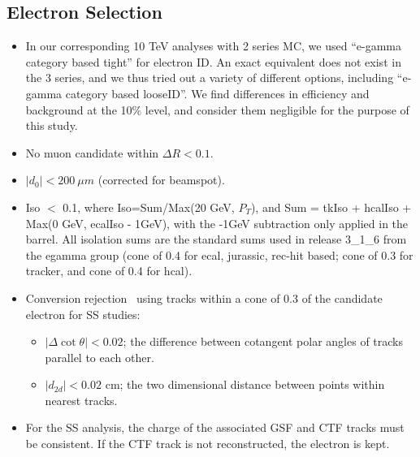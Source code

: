 \subsection{Electron Selection}
\label{sec:electron}

\begin{itemize}
\item In our corresponding 10 TeV analyses with 2 series MC, we used ``e-gamma category based tight'' for electron ID.
      An exact equivalent does not exist in the 3 series, and we thus tried out a variety of different options, including ``e-gamma category based looseID''.
      We find differences in efficiency and background at the 10\% level, and consider them negligible for the purpose of this study.
\item No muon candidate within $\Delta R < 0.1$.
\item $|d_0| < 200~\mu m$ (corrected for beamspot).
\item Iso $<$ 0.1, where Iso=Sum/Max(20 GeV, $P_T$), and Sum = tkIso + hcalIso +  Max(0 GeV, ecalIso - 1GeV), with the -1GeV subtraction
only applied in the barrel.
All isolation sums are the standard sums used in release 3\_1\_6 from the egamma group (cone of
0.4 for ecal, jurassic, rec-hit based; cone of 0.3 for tracker, and cone of 0.4 for hcal).
\item Conversion rejection~\cite{conversionnote} using tracks within a cone of 0.3 of the candidate electron for SS studies: 
\begin{itemize}
\item $|\Delta \cot\theta| < 0.02$; the difference between cotangent polar angles of tracks parallel to 
each other.
\item $|d_{2d}| < 0.02$ cm; the two dimensional distance between points within nearest tracks.
\end{itemize} 
\item For the SS analysis, the charge of the associated GSF and CTF tracks must be consistent.
If the CTF track is not reconstructed, the electron is kept.
\end{itemize}


